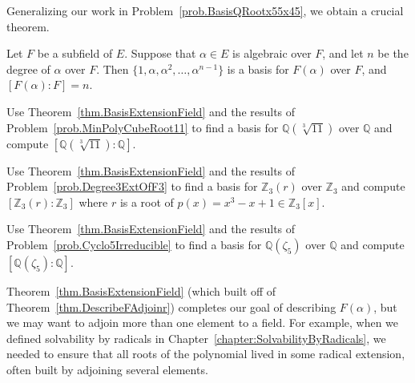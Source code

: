 Generalizing our work in Problem~\ref{prob.BasisQRootx55x45}, we obtain a crucial theorem.

\begin{theorem}\label{thm.BasisExtensionField}
Let $F$ be a subfield of $E$. Suppose that $\alpha\in E$ is algebraic over $F$, and let $n$ be the degree of $\alpha$ over $F$. Then $\{1,\alpha,\alpha^2,\ldots,\alpha^{n-1}\}$ is a basis for $F(\alpha)$ over $F$, and $[F(\alpha):F] = n$. 
\end{theorem}

\begin{problem}
Use Theorem~\ref{thm.BasisExtensionField} and the results of Problem~\ref{prob.MinPolyCubeRoot11} to find a basis for $\mathbb{Q}(\sqrt[3]{11})$ over $\mathbb{Q}$ and compute $[\mathbb{Q}(\sqrt[3]{11}):\mathbb{Q}]$.
\end{problem}

\begin{problem}
Use Theorem~\ref{thm.BasisExtensionField} and the results of Problem~\ref{prob.Degree3ExtOfF3} to find a basis for $\mathbb{Z}_3(r)$ over $\mathbb{Z}_3$ and compute $[\mathbb{Z}_3(r):\mathbb{Z}_3]$ where $r$ is a root of $p(x) = x^3-x+1 \in \mathbb{Z}_3[x]$.
\end{problem}

\begin{problem}
Use Theorem~\ref{thm.BasisExtensionField} and the results of Problem~\ref{prob.Cyclo5Irreducible} to find a basis for $\mathbb{Q}(\zeta_5)$ over $\mathbb{Q}$ and compute $[\mathbb{Q}(\zeta_5):\mathbb{Q}]$.
\end{problem}

Theorem~\ref{thm.BasisExtensionField} (which built off of Theorem~\ref{thm.DescribeFAdjoinr}) completes our goal of describing $F(\alpha)$, but we may want to adjoin more than one element to a field. For example, when we defined solvability by radicals in Chapter~\ref{chapter:SolvabilityByRadicals}, we needed to ensure that all roots of the polynomial lived in some radical extension, often built by adjoining several elements. 

